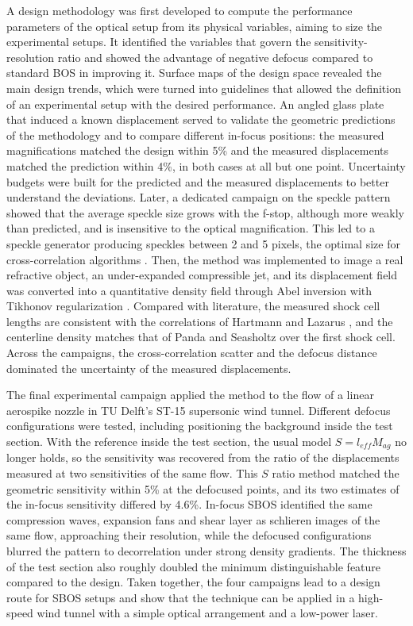 A design methodology was first developed to compute the performance parameters of the optical setup from its physical variables, aiming to size the experimental setups. It identified the variables that govern the sensitivity-resolution ratio and showed the advantage of negative defocus compared to standard BOS in improving it. Surface maps of the design space revealed the main design trends, which were turned into guidelines that allowed the definition of an experimental setup with the desired performance. An angled glass plate that induced a known displacement served to validate the geometric predictions of the methodology and to compare different in-focus positions: the measured magnifications matched the design within 5\% and the measured displacements matched the prediction within 4\%, in both cases at all but one point. Uncertainty budgets were built for the predicted and the measured displacements to better understand the deviations. Later, a dedicated campaign on the speckle pattern showed that the average speckle size grows with the f-stop, although more weakly than predicted, and is insensitive to the optical magnification. This led to a speckle generator producing speckles between 2 and 5 pixels, the optimal size for cross-correlation algorithms \cite{KahlerEtAl}. Then, the method was implemented to image a real refractive object, an under-expanded compressible jet, and its displacement field was converted into a quantitative density field through Abel inversion with Tikhonov regularization \cite{Daun2006}. Compared with literature, the measured shock cell lengths are consistent with the correlations of Hartmann and Lazarus \cite{Hartmann1941}, and the centerline density matches that of Panda and Seasholtz \cite{Panda1999} over the first shock cell. Across the campaigns, the cross-correlation scatter and the defocus distance dominated the uncertainty of the measured displacements.

The final experimental campaign applied the method to the flow of a linear aerospike nozzle in TU Delft's ST-15 supersonic wind tunnel. Different defocus configurations were tested, including positioning the background inside the test section. With the reference inside the test section, the usual model $S = l_{eff} M_{ag}$ no longer holds, so the sensitivity was recovered from the ratio of the displacements measured at two sensitivities of the same flow. This $S$ ratio method matched the geometric sensitivity within 5\% at the defocused points, and its two estimates of the in-focus sensitivity differed by 4.6\%. In-focus SBOS identified the same compression waves, expansion fans and shear layer as schlieren images of the same flow, approaching their resolution, while the defocused configurations blurred the pattern to decorrelation under strong density gradients. The thickness of the test section also roughly doubled the minimum distinguishable feature compared to the design. Taken together, the four campaigns lead to a design route for SBOS setups and show that the technique can be applied in a high-speed wind tunnel with a simple optical arrangement and a low-power laser.